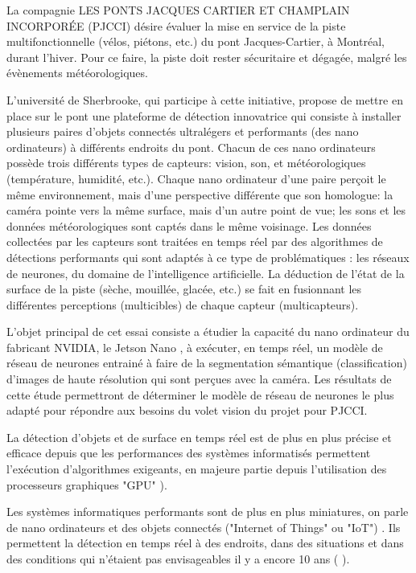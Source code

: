 ﻿\par La compagnie LES PONTS JACQUES CARTIER ET CHAMPLAIN INCORPORÉE (PJCCI) désire évaluer la mise en service de la piste multifonctionnelle (vélos, piétons, etc.) du pont Jacques-Cartier, à Montréal, durant l'hiver. Pour ce faire, la piste doit rester sécuritaire et dégagée, malgré les évènements météorologiques.
\par L'université de Sherbrooke, qui participe à cette initiative, propose de mettre en place sur le pont une plateforme de détection innovatrice qui consiste à installer plusieurs paires d'objets connectés ultralégers et performants (des nano ordinateurs) à différents endroits du pont. Chacun de ces nano ordinateurs possède trois différents types de capteurs: vision, son, et météorologiques (température, humidité, etc.). Chaque nano ordinateur d'une paire perçoit le même environnement, mais d'une perspective différente que son homologue: la caméra pointe vers la même surface, mais d'un autre point de vue; les sons et les données météorologiques sont captés dans le même voisinage. Les données collectées par les capteurs sont traitées en temps réel par des algorithmes de détections performants qui sont adaptés à ce type de problématiques : les réseaux de neurones, du domaine de l'intelligence artificielle. La déduction de l'état de la surface de la piste (sèche, mouillée, glacée, etc.) se fait en fusionnant les différentes perceptions (multicibles) de chaque capteur (multicapteurs).
\par L'objet principal de cet essai consiste a étudier la capacité du nano ordinateur du fabricant NVIDIA, le Jetson Nano \cite{nvidia_jetson_2019}, à exécuter, en temps réel, un modèle de réseau de neurones entrainé à faire de la segmentation sémantique (classification) d'images de haute résolution qui sont perçues avec la caméra. Les résultats de cette étude permettront de déterminer le modèle de réseau de neurones le plus adapté pour répondre aux besoins du volet vision du projet pour PJCCI. 
\par La détection d'objets et de surface en temps réel est de plus en plus précise et efficace depuis que les performances des systèmes informatisés permettent l'exécution d'algorithmes exigeants, en majeure partie depuis l'utilisation des processeurs graphiques "GPU" \cite{chong_real-time_1992} \cite{dettmers_deep_2015} \cite{beam_deep_2017} \cite{jiaconda_concise_2019} \cite{zheng_real-time_2020} \cite{kurenkov_brief_2015}). 
\par Les systèmes informatiques performants sont de plus en plus miniatures, on parle de nano ordinateurs et des objets connectés ("Internet of Things" ou "IoT") \cite{blanco-filgueira_deep_2019} \cite{sharma_history_2019}. Ils permettent la détection en temps réel à des endroits, dans des situations et dans des conditions qui n'étaient pas envisageables il y a encore 10 ans (\cite{zheng_real-time_2020} \cite{bernas_edge_2017} \cite{abouzahir_iot-empowered_2017} \cite{blanco-filgueira_deep_2019}).
